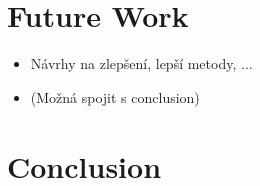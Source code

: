 \documentclass{mimosis}
\begin{document}
\chapter{Future Work}
\begin{itemize}
\item Návrhy na zlepšení, lepší metody, ...
\item (Možná spojit s conclusion)
\end{itemize}

\chapter{Conclusion}


\backmatter

  \begingroup
    \let\clearpage\relax
    \glsaddall
    \printglossary[type=\acronymtype]
  \endgroup

  \printindex
  \printbibliography
\end{document}
